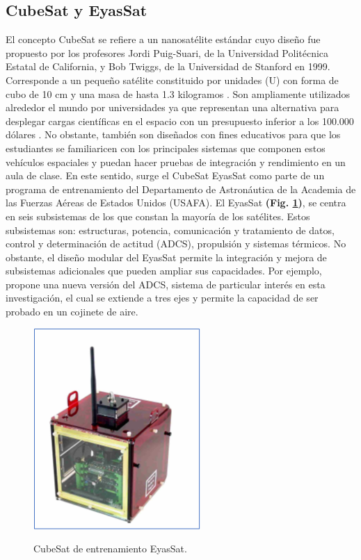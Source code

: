 \subsection{CubeSat y EyasSat}
El concepto CubeSat se refiere a un nanosatélite estándar cuyo diseño fue propuesto por los profesores Jordi Puig-Suari, de la Universidad Politécnica Estatal de California, y Bob Twiggs, de la Universidad de Stanford en 1999. Corresponde a un pequeño satélite constituido por unidades (U) con forma de cubo de 10 cm y una masa de hasta 1.3 kilogramos \cite{Lan2013}. Son ampliamente utilizados alrededor el mundo por universidades ya que representan una alternativa para desplegar cargas científicas en el espacio con un presupuesto inferior a los 100.000 dólares \cite{opc:Satcatalog}. 
No obstante, también son diseñados con fines educativos para que los estudiantes se familiaricen con los principales sistemas que componen estos vehículos espaciales y puedan hacer pruebas de integración y rendimiento en un aula de clase. En este sentido, surge el CubeSat EyasSat \cite{Barnhart2005} como parte de un programa de entrenamiento del Departamento de Astronáutica de la Academia de las Fuerzas Aéreas de Estados Unidos (USAFA). El EyasSat \textbf{(Fig. \ref{fig:eyassat})}, se centra en seis subsistemas de los que constan la mayoría de los satélites. Estos subsistemas son: estructuras, potencia, comunicación y tratamiento de datos, control y determinación de actitud (ADCS), propulsión y sistemas térmicos. No obstante, el diseño modular del EyasSat permite la integración y mejora de subsistemas adicionales que pueden ampliar sus capacidades. Por ejemplo, \cite{Groenewald2014} propone una nueva versión del ADCS, sistema de particular interés en esta investigación, el cual se extiende a tres ejes y permite la capacidad de ser probado en un cojinete de aire.


\begin{figure}[!ht]
	\begin{center}
		\includegraphics[scale=0.9]{imagenes/marco_teorico/eyassat.PNG}\\
	\end{center}
	\caption{CubeSat de entrenamiento EyasSat.}
	\label{fig:eyassat}
\end{figure}

